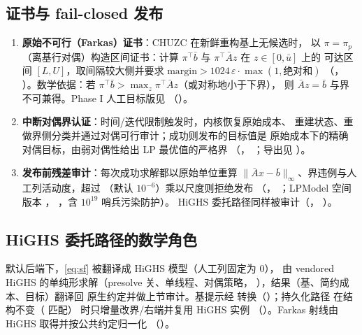 \documentclass[11pt]{ctexart}
\begin{document}
\subsection{证书与 fail-closed 发布}
\label{sec:cert}
\begin{enumerate}[label=(\roman*),leftmargin=2em]
\item \textbf{原始不可行（Farkas）证书}：CHUZC 在新鲜重构基上无候选时，
以 $\pi = \pi_p$（离基行对偶）构造区间证书：计算
$\pi^{\top}\bar b$ 与 $\pi^{\top}\bar A z$ 在 $z\in[0,\bar u]$ 上的
可达区间 $[L,U]$，取间隔较大侧并要求
$\mathrm{margin} > 1024\,\varepsilon\cdot\max(1,\text{绝对和})$
（，
）。数学依据：若
$\pi^{\top}\bar b > \max_{z}\pi^{\top}\bar A z$（或对称地小于下界），
则 $\bar A z = \bar b$ 与界不可兼得。Phase I 人工目标版见
（）。
\item \textbf{中断对偶界认证}：时间/迭代限制触发时，内核恢复原始成本、
重建状态、重做界侧分类并通过对偶可行审计；成功则发布的目标值是
原始成本下的精确对偶目标，由弱对偶性给出 LP 最优值的严格界
（，
；导出见
）。
\item \textbf{发布前残差审计}：每次成功求解都以原始单位重算
$\|\bar A x - \bar b\|_\infty$、界违例与人工列活动度，超过
（默认 $10^{-6}$）乘以尺度则拒绝发布
（，
；LPModel 空间版本
，
，含 $10^{19}$ 哨兵污染防护）。
HiGHS 委托路径同样被审计（，
）。
\end{enumerate}

\subsection{HiGHS 委托路径的数学角色}
默认后端下，\eqref{eq:sf} 被翻译成 HiGHS 模型（人工列固定为 0），
由 vendored HiGHS 的单纯形求解（presolve 关、单线程、对偶策略，
），结果（基、简约成本、目标）翻译回
原生约定并做上节审计。基提示经 
转换（）；持久化路径
 在结构不变（ 匹配）
时只增量改界/右端并复用 HiGHS 实例
（）。Farkas 射线由 HiGHS
 取得并按公共约定归一化
（）。
\end{document}
